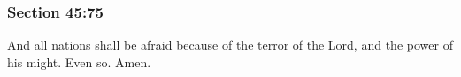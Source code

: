 	\subsubsection{Section 45:75} %
		\label{DC45-75}

		And all nations shall be afraid because of the terror of the Lord, and the power of his might.  Even so.  Amen.

